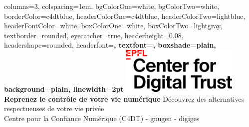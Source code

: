 \documentclass[a0paper,portrait]{baposter}
\begin{document}
\begin{poster}{
  columns=3,
  colspacing=1em,
  bgColorOne=white,
  bgColorTwo=white,
  borderColor=c4dtblue,
  headerColorOne=c4dtblue,
  headerColorTwo=lightblue,
  headerFontColor=white,
  boxColorOne=white,
  boxColorTwo=lightgray,
  textborder=rounded,
  eyecatcher=true,
  headerheight=0.08\textheight,
  headershape=rounded,
  headerfont=\Large\bf\textsf,
  textfont={\setlength{\parindent}{0em}},
  boxshade=plain,
  background=plain,
  linewidth=2pt
}
{\includegraphics[height=6em]{assets/logos/C4DT_logo.png}}
{\bf\textsf{\color{white}\Huge Reprenez le contrôle de votre vie numérique}}
{\textsf{\color{white}\Large Découvrez des alternatives respectueuses de votre vie privée}\\
\vspace{0.5em}
\textsf{\color{white}Centre pour la Confiance Numérique (C4DT) - gnugen - digiges}}
{\quad{}}

\end{poster}
\end{document}
